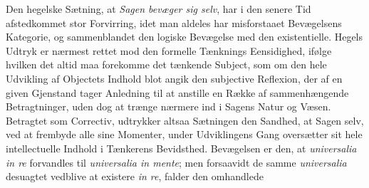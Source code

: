\documentclass[12pt]{book}
\newcommand{\dsi}{\textup{ɔ:}}
\newcommand{\opage}[1]{\marginnote{\footnotesize\textit{[#1]}}}
\begin{document}
Den hegelske Sætning, at \emph{Sagen bevæger sig selv}, har i den senere Tid afstedkommet stor
Forvirring, idet man aldeles har misforstaaet Bevægelsens Kategorie, og sammenblandet den
logiske Bevægelse med den existentielle. Hegels Udtryk er nærmest rettet mod den formelle
Tænknings Eensidighed, ifølge hvilken det altid maa forekomme det tænkende Subject, som om den
hele Udvikling af Objectets Indhold blot angik den subjective Reflexion, der af en given
Gjenstand tager Anledning til at anstille en Række af sammenhængende Betragtninger, uden dog at
trænge nærmere ind i Sagens Natur og Væsen. Betragtet som Correctiv, udtrykker altsaa Sætningen
den Sandhed, at Sagen selv, ved at frembyde alle sine Momenter, under Udviklingens Gang
oversætter sit hele intellectuelle Indhold i Tænkerens Bevidsthed. Bevægelsen er den, at
\textit{universalia in re} forvandles til \textit{universalia in mente}; men forsaavidt de
samme \textit{universalia} desuagtet vedblive at existere \textit{in re}, falder den omhandlede
\opage{108} %
\end{document}
